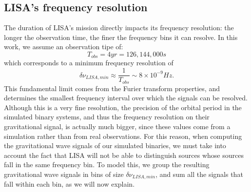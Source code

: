 \subsection{LISA's frequency resolution}
The duration of LISA’s mission directly impacts its frequency resolution: the longer the observation time, the finer the frequency bins it can resolve.
In this work, we assume an observation tipe of: 
\[
    T_{obs}=4yr=126,144,000s
\]
which corresponds to a minimum frequency resolution of
\begin{equation}
    \delta\nu_{LISA,min}\approx \frac{1}{T_{obs}}\sim 8\times 10^{-9}Hz.
    \label{eq: LISA frequency resolution}
\end{equation}
This fundamental limit comes from the Furier transform properties, and determines the smallest frequency interval over which the signals can be resolved.
Although this is a very fine resolution, the precision of the orbital period in the simulated binary systems, and thus the frequency resolution on their gravitational signal, is actually much bigger, since these values come from a simulation rather than from real observations.
For this reason, when computing the gravitational wave signals of our simulated binaries, we must take into account the fact that LISA will not be able to distinguish sources whose sources fall in the same frequency bin.
To model this, we group the resulting gravitational wave signals in bins of size $\delta\nu_{LISA,min}$, and sum all the signals that fall within each bin, as we will now explain.

